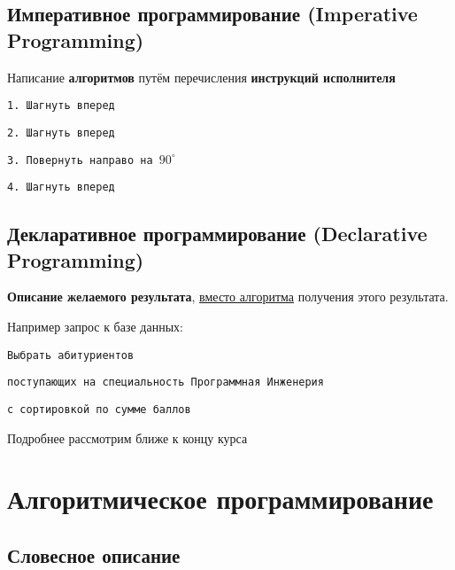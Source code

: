     \subsection{Императивное программирование (Imperative Programming)}
    \begin{frame}
      Написание \textbf{алгоритмов} путём перечисления \textbf{инструкций исполнителя}
        \vspace{1cm}

        \texttt{1. Шагнуть вперед}

        \texttt{2. Шагнуть вперед}

        \texttt{3. Повернуть направо на $90^\circ$}

        \texttt{4. Шагнуть вперед}
        \vspace{1cm}
    \end{frame}

    \subsection{Декларативное программирование (Declarative Programming)}
    \begin{frame}
      \textbf{Описание желаемого результата}, \underline{вместо алгоритма} получения этого результата.\linebreak
        \vspace{1cm}

        Например запрос к базе данных:

        \vspace{0.5cm}
        \texttt{Выбрать абитуриентов}

        \texttt{поступающих на специальность Программная Инженерия}

        \texttt{с сортировкой по сумме баллов}
        \vspace{1cm}

        Подробнее рассмотрим ближе к концу курса
    \end{frame}


  \section{Алгоритмическое программирование}

    \subsection{Словесное описание}

